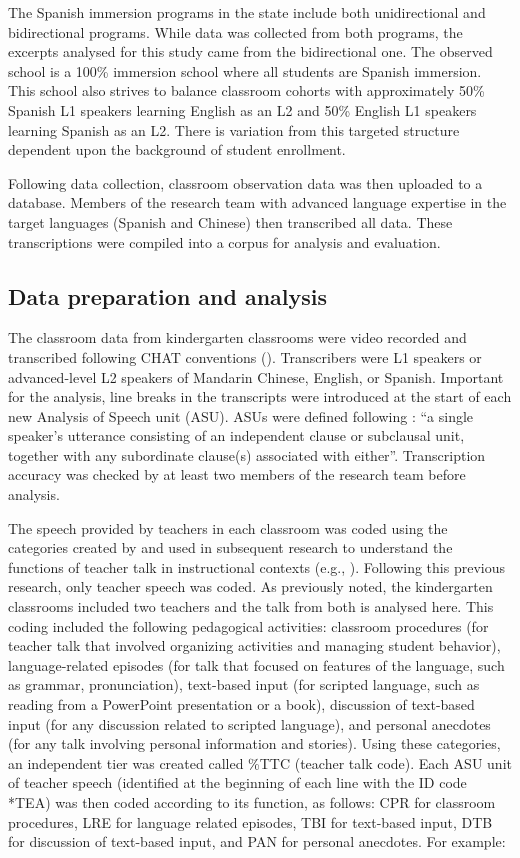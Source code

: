\documentclass[output=paper,chinesefont]{langscibook}
\begin{document}
The Spanish immersion programs in the state include both unidirectional and bidirectional programs. While data was collected from both programs, the excerpts analysed for this study came from the bidirectional one. The observed school is a 100\% immersion school where all students are Spanish immersion. This school also strives to balance classroom cohorts with approximately 50\% Spanish L1 speakers learning English as an L2 and 50\% English L1 speakers learning Spanish as an L2. There is variation from this targeted structure dependent upon the background of student enrollment.

Following data collection, classroom observation data was then uploaded to a database. Members of the research team with advanced language expertise in the target languages (Spanish and Chinese) then transcribed all data. These transcriptions were compiled into a corpus for analysis and evaluation. 

\subsection{Data preparation and analysis}

The classroom data from kindergarten classrooms were video recorded and transcribed following CHAT conventions (\citealt{MacWhinney2000}). Transcribers were L1 speakers or advanced-level L2 speakers of Mandarin Chinese, English, or Spanish. Important for the analysis, line breaks in the transcripts were introduced at the start of each new Analysis of Speech unit (ASU). ASUs were defined following \citet[365]{FosterEtAl2000}: ``a single speaker’s utterance consisting of an independent clause or subclausal unit, together with any subordinate clause(s) associated with either''. Transcription accuracy was checked by at least two members of the research team before analysis.

The speech provided by teachers in each classroom was coded using the categories created by \citet{CollinsEtAl2012} and used in subsequent research to understand the functions of teacher talk in instructional contexts (e.g., \citealt{Huensch2019}). Following this previous research, only teacher speech was coded. As previously noted, the kindergarten classrooms included two teachers and the talk from both is analysed here. This coding included the following pedagogical activities: classroom procedures (for teacher talk that involved organizing activities and managing student behavior), language-related episodes (for talk that focused on features of the language, such as grammar, pronunciation), text-based input (for scripted language, such as reading from a PowerPoint presentation or a book), discussion of text-based input (for any discussion related to scripted language), and personal anecdotes (for any talk involving personal information and stories). Using these categories, an independent tier was created called \%TTC (teacher talk code). Each ASU unit of teacher speech (identified at the beginning of each line with the ID code *TEA) was then coded according to its function, as follows: CPR for classroom procedures, LRE for language related episodes, TBI for text-based input, DTB for discussion of text-based input, and PAN for personal anecdotes. For example:
\end{document}
